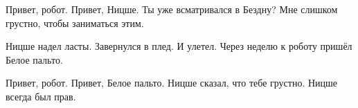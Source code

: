 \begin{dialog}
\X Привет, робот.
\R Привет, Ницше.
\X Ты уже всматривался в Бездну?
\R Мне слишком грустно, чтобы заниматься этим.
\end{dialog}

\begin{monolog}
Ницше надел ласты. Завернулся в плед. И улетел. Через неделю к роботу пришёл Белое пальто.
\end{monolog}

\begin{dialog}
\X Привет, робот.
\R Привет, Белое пальто.
\X Ницше сказал, что тебе грустно.
\X Ницше всегда был прав.
\end{dialog}